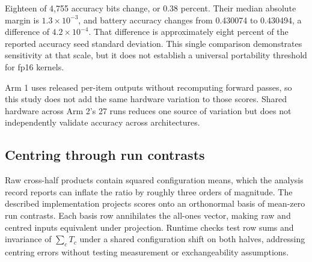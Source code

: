Eighteen of 4,755 accuracy bits change, or 0.38 percent. Their median absolute margin is $1.3\times10^{-3}$, and battery accuracy changes from 0.430074 to 0.430494, a difference of $4.2\times10^{-4}$. That difference is approximately eight percent of the reported accuracy seed standard deviation. This single comparison demonstrates sensitivity at that scale, but it does not establish a universal portability threshold for fp16 kernels.

Arm 1 uses released per-item outputs without recomputing forward passes, so this study does not add the same hardware variation to those scores. Shared hardware across Arm 2's 27 runs reduces one source of variation but does not independently validate accuracy across architectures.

\subsection{Centring through run contrasts}
\label{app:centring}
Raw cross-half products contain squared configuration means, which the analysis record reports can inflate the ratio by roughly three orders of magnitude. The described implementation projects scores onto an orthonormal basis of mean-zero run contrasts. Each basis row annihilates the all-ones vector, making raw and centred inputs equivalent under projection. Runtime checks test row sums and invariance of $\sum_c T_c$ under a shared configuration shift on both halves, addressing centring errors without testing measurement or exchangeability assumptions.
